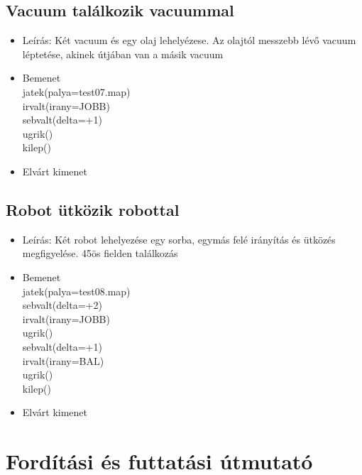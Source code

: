 \subsection{Vacuum találkozik vacuummal}
\begin{itemize}
	\item Leírás: Két vacuum és egy olaj lehelyézese. Az olajtól messzebb lévő vacuum léptetése, akinek útjában van a másik vacuum
	\item Bemenet\\
    jatek(palya=test07.map)\\
    irvalt(irany=JOBB)\\
    sebvalt(delta=+1)\\
    ugrik()\\
    kilep()\\
	\item Elvárt kimenet\\

\end{itemize}

\subsection{Robot ütközik robottal}
\begin{itemize}
	\item Leírás: Két robot lehelyezése egy sorba, egymás felé irányítás és ütközés megfigyelése. 45ös fielden találkozás
	\item Bemenet\\
    jatek(palya=test08.map)\\
    sebvalt(delta=+2)\\
    irvalt(irany=JOBB)\\
    ugrik()\\
    sebvalt(delta=+1)\\
    irvalt(irany=BAL)\\
    ugrik()\\
    kilep()\\
	\item Elvárt kimenet\\

\end{itemize}

\section{Fordítási és futtatási útmutató}

